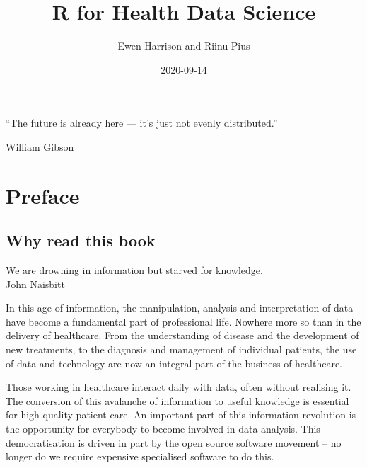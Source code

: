 \documentclass[
  12pt,
  krantz2]{krantz}
\title{R for Health Data Science}
\author{Ewen Harrison and Riinu Pius}
\date{2020-09-14}
\renewenvironment{quote}{\begin{VF}}{\end{VF}}
\begin{document}
\maketitle


\thispagestyle{empty}

\begin{center}
``The future is already here — it's just not evenly distributed.''

William Gibson
\end{center}

\setlength{\abovedisplayskip}{-5pt}
\setlength{\abovedisplayshortskip}{-5pt}

{
\hypersetup{linkcolor=}
\setcounter{tocdepth}{2}
\tableofcontents
}
\listoftables
\listoffigures
\hypertarget{preface}{%
\chapter*{Preface}\label{preface}}


\hypertarget{why-read-this-book}{%
\section*{Why read this book}\label{why-read-this-book}}


\begin{quote}
We are drowning in information but starved for knowledge.\\
John Naisbitt
\end{quote}

In this age of information, the manipulation, analysis and interpretation of data have become a fundamental part of professional life.
Nowhere more so than in the delivery of healthcare.
From the understanding of disease and the development of new treatments, to the diagnosis and management of individual patients, the use of data and technology are now an integral part of the business of healthcare.

Those working in healthcare interact daily with data, often without realising it.
The conversion of this avalanche of information to useful knowledge is essential for high-quality patient care.
An important part of this information revolution is the opportunity for everybody to become involved in data analysis.
This democratisation is driven in part by the open source software movement -- no longer do we require expensive specialised software to do this.
\end{document}
